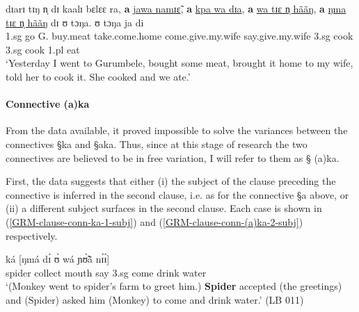 \begin{exe}
\ex\label{ex:GRM-coor-vp8.1}
\gll dɪarɪ tɪŋ n̩ dɪ kaalɪ bɛlɛɛ ra, \textbf{a} \underline{jawa namɪɛ̃},
\textbf{a} \underline{kpa wa dɪa}, \textbf{a}  \underline{wa tɪɛ n̩ hããŋ},
\textbf{a} 
\underline{ŋma tɪɛ n̩ hããŋ} dɪ ʊ tɔŋa. ʊ tɔŋa ja di \\ 
{\advt} {\art} {\sc 1.sg} {\hest} {go} {G.}  {\foc} {\conn}  {buy.meat} 
{\conn} {take.come.home} {\conn} {come.give.my.wife}  {\conn} {say.give.my.wife}
{\comp}  {\sc 3.sg}   {cook}    {\sc 3.sg}   {cook}  {\sc 1.pl} {eat} \\
\glt  `Yesterday I went to Gurumbele,  bought some meat, brought it
home to my wife, told her to cook it. She cooked and we ate.'
\end{exe}


\paragraph{Connective (a)ka}
\label{GRM-clause-coord-ka-aka}

From the data available, it proved impossible to solve the variances between the
connectives {\S ka} and {\S aka}. Thus, since at this stage of research the two
connectives are believed to be in free variation, I will refer to them as {\S
(a)ka}. 

First, the data suggests that either (i) the subject of the clause preceding the
connective is inferred in the second clause, i.e. as for  the connective  {\S a}
above, or (ii) a different subject surfaces in the second clause. Each case is
shown in (\ref{GRM-clause-conn-ka-1-subj}) and
(\ref{GRM-clause-conn-(a)ka-2-subj}) respectively.


\begin{exe}
\ex\label{GRM-clause-conn-ka-1-subj} 
    ká  [ŋmá dɪ́    ʊ̀  wá  
ɲʊ̃̀ã̀ nɪ́ɪ́] \\
spider collect mouth {\postp}  {\conn} say {\comp}  
{\sc 3.sg}  come   drink water\\
\glt  `(Monkey went to spider's farm to greet him.)  \textbf{Spider} accepted
(the
greetings) and (Spider) asked him (Monkey) to come and drink water.'  (LB 011)
 \end{exe}



